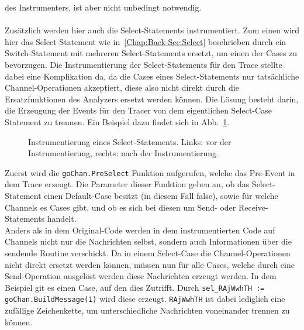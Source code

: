 des Instrumenters, ist aber nicht unbedingt notwendig.\\\\
Zusätzlich werden hier auch die Select-Statements instrumentiert. 
Zum einen wird hier das Select-Statement wie in~\ref{Chap:Back-Sec:Select} 
beschrieben durch ein Switch-Statement mit mehreren Select-Statements 
ersetzt, um einen der Cases zu bevorzugen. 
Die Instrumentierung der Select-Statements für den Trace stellte dabei 
eine Komplikation da, da die Cases eines Select-Statements nur tatsächliche
Channel-Operationen akzeptiert, diese also nicht direkt durch die Ersatzfunktionen 
des Analyzers ersetzt werden können. Die Lösung besteht darin, die 
Erzeugung der Events für den Tracer von dem eigentlichen Select-Case Statement 
zu trennen. Ein Beispiel dazu findet sich in 
Abb.~\ref{Chap:Instrumenter-Sec:Instrumenter-Fig:SelectFull}.
\begin{figure}[h!]
  \begin{minipage}[t]{0.3\textwidth}
    
  \end{minipage}
  \begin{minipage}[t]{0.65\textwidth}
    
  \end{minipage}
  \caption{Instrumentierung eines Select-Statements. Links: vor der 
    Instrumentierung, rechts: nach der Instrumentierung.}
  \label{Chap:Instrumenter-Sec:Instrumenter-Fig:SelectFull}
\end{figure}
Zuerst wird die \texttt{goChan.PreSelect} Funktion aufgerufen, welche das 
Pre-Event in dem Trace erzeugt. Die Parameter dieser Funktion geben an, 
ob das Select-Statement einen Default-Case besitzt (in diesem Fall false),
sowie für welche Channels es Cases gibt, und ob es sich bei diesen 
um Send- oder Receive-Statements handelt.\\
Anders als in dem Original-Code 
werden in dem instrumentierten Code auf Channels nicht nur die Nachrichten selbst, 
sondern auch Informationen über die sendende Routine verschickt. Da in einem 
Select-Case die Channel-Operationen nicht direkt ersetzt werden können, 
müssen nun für alle Cases, welche durch eine Send-Operation ausgelöst werden 
diese Nachrichten erzeugt werden. In dem Beispiel git es einen Case, 
auf den dies Zutrifft. Durch \texttt{sel\_RAjWwhTH := goChan.BuildMessage(1)}
wird diese erzeugt. \texttt{RAjWwhTH} ist dabei lediglich eine zufällige 
Zeichenkette, um unterschiedliche Nachrichten voneinander trennen zu können. 
